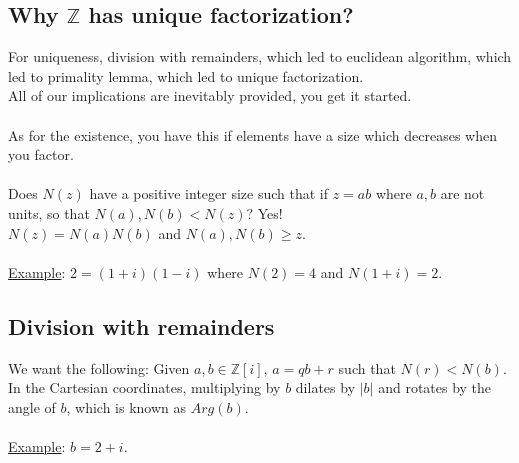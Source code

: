   \subsection*{Why $\mathbb{Z}$ has unique factorization?}
    For uniqueness, division with remainders, which led to euclidean algorithm,
    which led to primality lemma, which led to unique factorization.\\
    All of our implications are inevitably provided, you get it started.\\\\
    As for the existence, you have this if elements have a size which decreases
    when you factor.\\\\
    Does $N(z)$ have a positive integer size such that if $z = ab$ where
    $a,b$ are not units, so that $N(a), N(b) < N(z)?$ Yes!\\
    $N(z) = N(a)N(b)$ and $N(a),N(b) \ge z$.\\\\
    \underline{Example}: $2 = (1 + i)(1 - i)$ where $N(2) = 4$ and $N(1+i) = 
    2$.\\
  \subsection*{Division with remainders}
    We want the following: Given $a,b \in \mathbb{Z}[i]$, $a = qb + r$ such 
    that $N(r) < N(b)$.\\
    In the Cartesian coordinates, multiplying by $b$ dilates by $|b|$ and
    rotates by the angle of $b$, which is known as $Arg(b)$.\\\\
    \underline{Example}: $b = 2 + i$.
